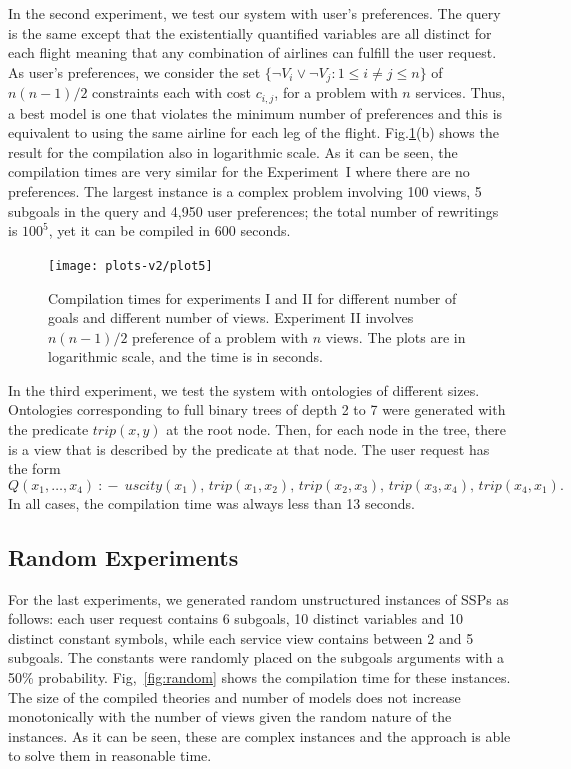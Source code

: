\documentclass{llncs}
\newcommand{\qrule}{:\!\!-}
\newcommand{\trip}{\textit{trip}}
\newcommand{\UScity}{\textit{uscity}}
\begin{document}
In the second experiment, we test our system with user's preferences.
The query is the same except that the existentially quantified variables
are all distinct for each flight meaning that any combination of airlines
can fulfill the user request.
As user's preferences, we consider the set
$\{\neg V_i \lor \neg V_j : 1\leq i\neq j\leq n\}$ of $n(n-1)/2$ constraints
each with cost $c_{i,j}$, for a problem with $n$ services.
Thus, a best model is one that violates the minimum number of preferences
and this is equivalent to using the same airline
for each leg of the flight. Fig.\ref{fig:plot1}(b) shows the result for
the compilation also in logarithmic scale.
As it can be seen,  the compilation times are very similar for the
Experiment~I where there are no preferences.
The largest instance is a complex problem involving 100 views, 5 subgoals
in the query and 4,950 user preferences; the total number of rewritings
is $100^5$, yet it can be compiled in 600 seconds.

\begin{figure}[t]
\centering
\texttt{[image: plots-v2/plot5]}
\caption{Compilation times for experiments I and II for different
number of goals and different number of views.
Experiment II involves $n(n-1)/2$ preference of a problem with $n$ views.
The plots are in logarithmic scale, and the time is in seconds.}
\label{fig:plot1}
\end{figure}

In the third experiment, we test the system with ontologies of different sizes.
Ontologies corresponding to full binary trees of depth 2 to 7 were generated with
the predicate $\trip(x,y)$ at the root node. Then, for each node in the tree,
there is a view that is described by the predicate at that node.
The user request has the form
\[ Q(x_1,\ldots,x_4)\ \qrule\  \UScity(x_1),\,\trip(x_1,x_2),\,\trip(x_2,x_3),\,\trip(x_3,x_4),\,\trip(x_4,x_1).\]
In all cases, the compilation time was always less than 13 seconds.

\subsection{Random Experiments}

For the last experiments, we generated random unstructured instances of SSPs
as follows: each user request contains 6 subgoals, 10 distinct variables and
10 distinct constant symbols, while each service view contains between 2 and
5 subgoals. The constants were randomly placed on the subgoals arguments with
a 50\% probability.
Fig,~\ref{fig:random} shows the compilation time for these instances. 
The size of the compiled theories and number of models does not increase
monotonically with the number of views given the random nature of the
instances. As it can be seen, these are complex instances and the approach
is able to solve them in reasonable time.
\end{document}

